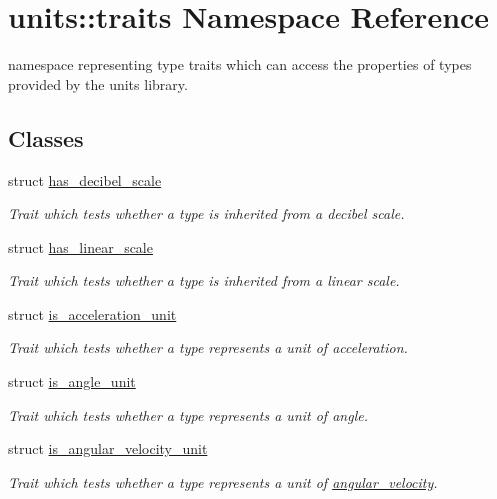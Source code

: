\hypertarget{namespaceunits_1_1traits}{}\section{units\+:\+:traits Namespace Reference}
\label{namespaceunits_1_1traits}


namespace representing type traits which can access the properties of types provided by the units library.  


\subsection*{Classes}
\begin{DoxyCompactItemize}
\item 
struct \hyperlink{structunits_1_1traits_1_1has__decibel__scale}{has\+\_\+decibel\+\_\+scale}
\begin{DoxyCompactList}\small\item\em Trait which tests whether a type is inherited from a decibel scale. \end{DoxyCompactList}\item 
struct \hyperlink{structunits_1_1traits_1_1has__linear__scale}{has\+\_\+linear\+\_\+scale}
\begin{DoxyCompactList}\small\item\em Trait which tests whether a type is inherited from a linear scale. \end{DoxyCompactList}\item 
struct \hyperlink{structunits_1_1traits_1_1is__acceleration__unit}{is\+\_\+acceleration\+\_\+unit}
\begin{DoxyCompactList}\small\item\em Trait which tests whether a type represents a unit of acceleration. \end{DoxyCompactList}\item 
struct \hyperlink{structunits_1_1traits_1_1is__angle__unit}{is\+\_\+angle\+\_\+unit}
\begin{DoxyCompactList}\small\item\em Trait which tests whether a type represents a unit of angle. \end{DoxyCompactList}\item 
struct \hyperlink{structunits_1_1traits_1_1is__angular__velocity__unit}{is\+\_\+angular\+\_\+velocity\+\_\+unit}
\begin{DoxyCompactList}\small\item\em Trait which tests whether a type represents a unit of \hyperlink{namespaceunits_1_1angular__velocity}{angular\+\_\+velocity}. \end{DoxyCompactList}\item 

\end{DoxyCompactItemize}
